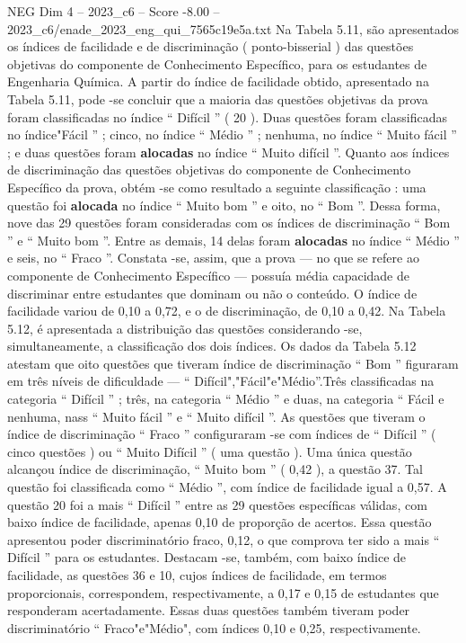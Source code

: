 \begin{textsample}{NEG Dim 4 – 2023\_c6 – Score -8.00 – 2023\_c6/enade\_2023\_eng\_qui\_7565c19e5a.txt}
Na Tabela 5.11, são apresentados os índices de facilidade e de discriminação ( ponto-bisserial ) das questões objetivas do componente de Conhecimento Específico, para os estudantes de Engenharia Química.
A partir do índice de facilidade obtido, apresentado na Tabela 5.11, pode -se concluir que a maioria das questões objetivas da prova foram classificadas no índice “ Difícil ” ( 20 ).
Duas questões foram classificadas no índice"Fácil ” ; cinco, no índice “ Médio ” ; nenhuma, no índice “ Muito fácil ” ; e duas questões foram \textbf{alocadas} no índice “ Muito difícil ”.
Quanto aos índices de discriminação das questões objetivas do componente de Conhecimento Específico da prova, obtém -se como resultado a seguinte classificação : uma questão foi \textbf{alocada} no índice “ Muito bom ” e oito, no “ Bom ”.
Dessa forma, nove das 29 questões foram consideradas com os índices de discriminação “ Bom ” e “ Muito bom ”.
Entre as demais, 14 delas foram \textbf{alocadas} no índice “ Médio ” e seis, no “ Fraco ”.
Constata -se, assim, que a prova — no que se refere ao componente de Conhecimento Específico — possuía média capacidade de discriminar entre estudantes que dominam ou não o conteúdo.
O índice de facilidade variou de 0,10 a 0,72, e o de discriminação, de 0,10 a 0,42.
Na Tabela 5.12, é apresentada a distribuição das questões considerando -se, simultaneamente, a classificação dos dois índices.
Os dados da Tabela 5.12 atestam que oito questões que tiveram índice de discriminação “ Bom ” figuraram em três níveis de dificuldade — “ Difícil","Fácil"e"Médio”.Três classificadas na categoria “ Difícil ” ; três, na categoria “ Médio ” e duas, na categoria “ Fácil e nenhuma, nass “ Muito fácil ” e “ Muito difícil ”.
As questões que tiveram o índice de discriminação “ Fraco ” configuraram -se com índices de “ Difícil ” ( cinco questões ) ou “ Muito Difícil ” ( uma questão ).
Uma única questão alcançou índice de discriminação, “ Muito bom ” ( 0,42 ), a questão 37.
Tal questão foi classificada como “ Médio ”, com índice de facilidade igual a 0,57.
A questão 20 foi a mais “ Difícil ” entre as 29 questões específicas válidas, com baixo índice de facilidade, apenas 0,10 de proporção de acertos.
Essa questão apresentou poder discriminatório fraco, 0,12, o que comprova ter sido a mais “ Difícil ” para os estudantes.
Destacam -se, também, com baixo índice de facilidade, as questões 36 e 10, cujos índices de facilidade, em termos proporcionais, correspondem, respectivamente, a 0,17 e 0,15 de estudantes que responderam acertadamente.
Essas duas questões também tiveram poder discriminatório “ Fraco"e"Médio", com índices 0,10 e 0,25, respectivamente.

\end{textsample}
